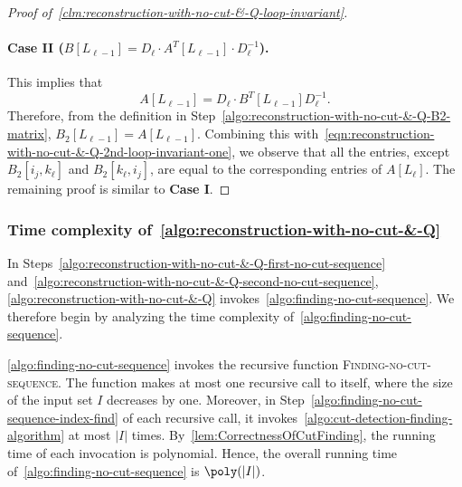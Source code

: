 \documentclass[11pt,letterpaper]{article}
\begin{document}
{{{\begin{proof}[Proof of~\cref{clm:reconstruction-with-no-cut-&-Q-loop-invariant}]
\paragraph*{Case II ($B[L_{\ell-1}]=D_\ell\cdot A^T[L_{\ell-1}]\cdot D_{\ell}^{-1}$).} This implies that $$A[L_{\ell-1}]= D_\ell\cdot B^T[L_{\ell-1}]D_{\ell}^{-1}.$$ Therefore, from the definition in Step~\ref{algo:reconstruction-with-no-cut-&-Q-B2-matrix}, $B_2[L_{\ell-1}]=A[L_{\ell-1}]$. Combining this with~\cref{eqn:reconstruction-with-no-cut-&-Q-2nd-loop-invariant-one}, we observe that all the entries, except $B_2[i_j, k_\ell]$ and $B_2[k_\ell, i_j]$, are equal to the corresponding entries of $A[L_\ell]$. The remaining proof is similar to \textbf{Case I}. 
\end{proof}

\subsubsection{Time complexity of~\cref{algo:reconstruction-with-no-cut-&-Q}} In Steps~\ref{algo:reconstruction-with-no-cut-&-Q-first-no-cut-sequence} and~\ref{algo:reconstruction-with-no-cut-&-Q-second-no-cut-sequence},  \cref{algo:reconstruction-with-no-cut-&-Q} invokes~\cref{algo:finding-no-cut-sequence}. We therefore begin by analyzing the time complexity of~\cref{algo:finding-no-cut-sequence}. 

\cref{algo:finding-no-cut-sequence} invokes the recursive function \textsc{Finding-no-cut-sequence}. The function makes at most one recursive call to itself, where the size of the input set $I$ decreases by one. Moreover, in Step~\ref{algo:finding-no-cut-sequence-index-find} of each recursive call, it invokes~\cref{algo:cut-detection-finding-algorithm} at most $|I|$ times. By~\cref{lem:CorrectnessOfCutFinding}, the running time of each invocation is polynomial. Hence, the overall running time of~\cref{algo:finding-no-cut-sequence} is $\poly(|I|)$.

}}}
\end{document}
